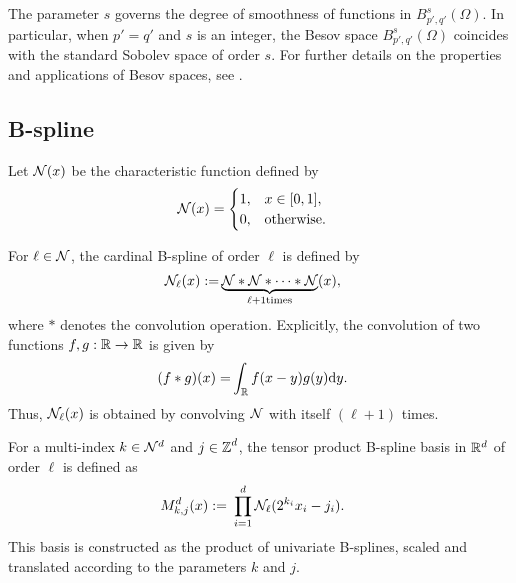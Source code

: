 \begin{remark}
The parameter $s$ governs the degree of smoothness of functions in $B^{s}_{p',q'}(\Omega)$. In particular, when $p' = q'$ and $s$ is an integer, the Besov space $B^{s}_{p',q'}(\Omega)$ coincides with the standard Sobolev space of order $s$. For further details on the properties and applications of Besov spaces, see \cite{t92}.
\end{remark}

\subsection{B-spline}

\begin{definition}\label{def:indicator_func}
Let ${\cal N}(x)$ be the characteristic function defined by
\begin{align*}
    {\cal N}(x) &=
    \begin{cases}
        1, & x \in [0,1],\\
        0, & \mathrm{otherwise}.
    \end{cases}
\end{align*}
\end{definition}

\begin{definition}\label{def:cardinal_b_spline}
For $\ell \in \mathcal{N}$, the cardinal B-spline of order $\ell$ is defined by
\begin{align*}
    {\cal N}_\ell(x) 
    := & 
    \underbrace{{\cal N} * {\cal N} * \cdots * {\cal N}}_{\ell+1 \mathrm{ times}}(x),
\end{align*}
where $*$ denotes the convolution operation. Explicitly, the convolution of two functions $f,g: \mathbb{R} \to \mathbb{R}$ is given by
\begin{align*}
    (f * g)(x) =& \int_{\mathbb{R}} f(x-y)  g(y)  \mathrm{d} y.
\end{align*}
Thus, ${\cal N}_\ell(x)$ is obtained by convolving ${\cal N}$ with itself $(\ell+1)$ times.
\end{definition}

\begin{definition}\label{def:tensor_product_b_spline}
For a multi-index $k \in \mathcal{N}^d$ and $j \in  \operatorname*{\mathbb{Z}}^d$, the tensor product B-spline basis in $ \mathbb{R}^d$ of order $\ell$ is defined as
\begin{align*}
    M_{k,j}^d(x) :=&~ \prod_{i=1}^d {\cal N}_\ell (2^{k_i} x_i - j_i).
\end{align*}
This basis is constructed as the product of univariate B-splines, scaled and translated according to the parameters $k$ and $j$.
\end{definition}

